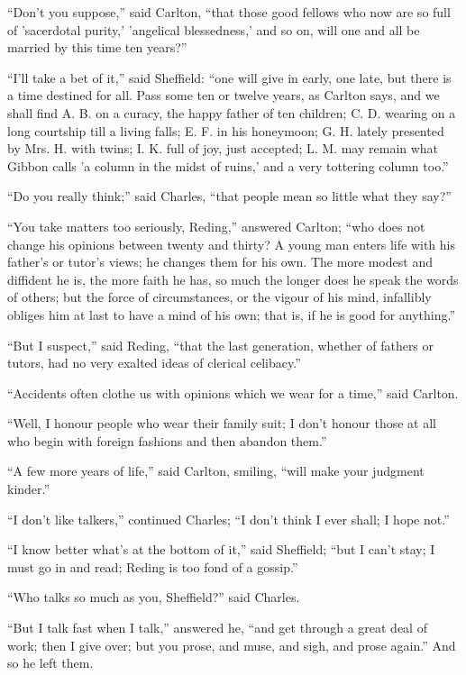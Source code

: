 ``Don't you suppose,'' said Carlton, ``that those good
fellows who now are so full of 'sacerdotal purity,' 'angelical
blessedness,' and so on, will one and all be married by this time ten
years?''

``I'll take a bet of it,'' said Sheffield: ``one will
give in early, one late, but there is a time destined for all. Pass
some ten or twelve years, as Carlton says, and we shall find A. B. on
a curacy, the happy father of ten children; C. D. wearing on a long
courtship till a living falls; E. F. in his honeymoon; G. H. lately
presented by Mrs. H. with twins; I. K. full of joy, just accepted; L.
M. may remain what Gibbon calls 'a column in the midst of ruins,' and
a very tottering column too.''

``Do you really think;'' said Charles, ``that people
mean so little what they say?''

``You take matters too seriously, Reding,'' answered
Carlton; ``who does not change his opinions between twenty and
thirty? A young man enters life with his father's or tutor's views; he
changes them for his own. The more modest and diffident he is, the
more faith he has, so much the longer does he speak the words of
others; but the force of circumstances, or the vigour of his mind,
infallibly obliges him at last to have a mind of his own; that is, if
he is good for anything.''

``But I suspect,'' said Reding, ``that the last
generation, whether of fathers or tutors, had no very exalted ideas of
clerical celibacy.''

``Accidents often clothe us with opinions which we wear for a
time,'' said Carlton.

``Well, I honour people who wear their family suit; I don't
honour those at all who begin with foreign fashions and then abandon
them.''

``A few more years of life,'' said Carlton, smiling,
``will make your judgment kinder.''

``I don't like talkers,'' continued Charles; ``I don't
think I ever shall; I hope not.''

``I know better what's at the bottom of it,'' said
Sheffield; ``but I can't stay; I must go in and read; Reding is
too fond of a gossip.''

``Who talks so much as you, Sheffield?'' said Charles.

``But I talk fast when I talk,'' answered he, ``and get
through a great deal of work; then I give over; but you prose, and
muse, and sigh, and prose again.'' And so he left them.

